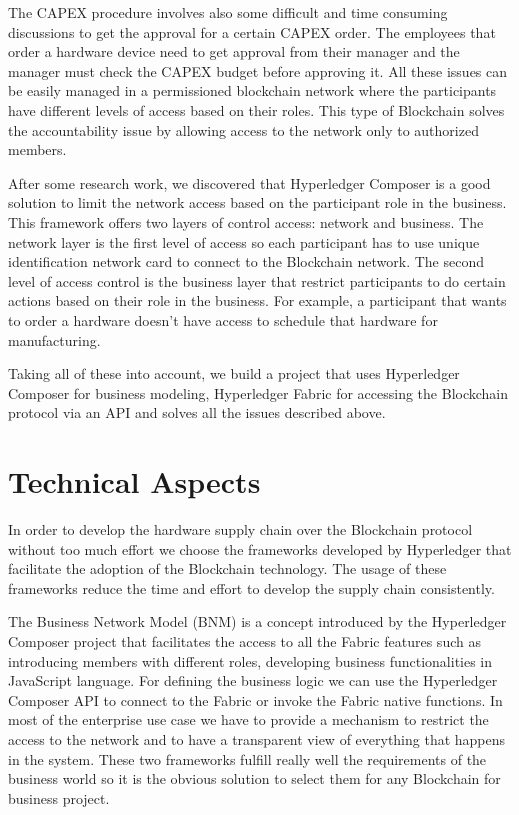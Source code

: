 The CAPEX procedure involves also some difficult and time consuming discussions to get the approval for a certain CAPEX order. The employees that order a hardware device need to get approval from their manager and the manager must check the CAPEX budget before approving it. All these issues can be easily managed in a permissioned blockchain network where the participants have different levels of access based on their roles. This type of Blockchain solves the accountability issue by allowing access to the network only to authorized members. 

After some research work, we discovered that Hyperledger Composer is a good solution to limit the network access based on the participant role in the business. This framework offers two layers of control access: network and business. The network layer is the first level of access so each participant has to use unique identification network card to connect to the Blockchain network. The second level of access control is the business layer that restrict participants to do certain actions based on their role in the business. For example, a participant that wants to order a hardware doesn't have access to schedule that hardware for manufacturing.

Taking all of these into account, we build a project that uses Hyperledger Composer for business modeling, Hyperledger Fabric for accessing the Blockchain protocol via an API and solves all the issues described above.


\section{Technical Aspects}
\label{sec:chapter3-section2}
In order to develop the hardware supply chain over the Blockchain protocol without too much effort we choose the frameworks developed by Hyperledger that facilitate the adoption of the Blockchain technology. The usage of these frameworks reduce the time and effort to develop the supply chain consistently.

The Business Network Model (BNM) is a concept introduced by the Hyperledger Composer project that facilitates the access to all the Fabric features such as introducing members with different roles, developing business functionalities in JavaScript language. For defining the business logic we can use the Hyperledger Composer API to connect to the Fabric or invoke the Fabric native functions. In most of the enterprise use case we have to provide a mechanism to restrict the access to the network and to have a transparent view of everything that happens in the system. 
These two frameworks fulfill really well the requirements of the business world so
it is the obvious solution to select them for any Blockchain for business project.

